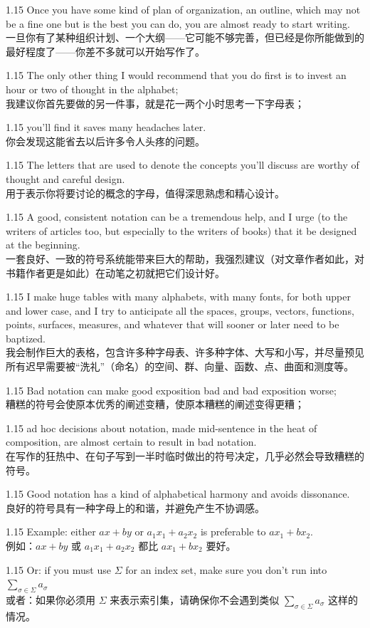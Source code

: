 \documentclass[12pt,a4paper]{article}
\newcommand{\bilingual}[2]{
    \begin{spacing}{1.15} %
        \noindent \normalsize #1 \\[-0.5ex] %
        \small \textcolor{blue!70!black}{#2} %
    \end{spacing}
    \vspace{0.8em} %
}
\begin{document}
\bilingual{Once you have some kind of plan of organization, an outline, which may not be a fine one but is the best you can do, you are almost ready to start writing.}
{一旦你有了某种组织计划、一个大纲——它可能不够完善，但已经是你所能做到的最好程度了——你差不多就可以开始写作了。} %

\bilingual{The only other thing I would recommend that you do first is to invest an hour or two of thought in the alphabet;}
{我建议你首先要做的另一件事，就是花一两个小时思考一下字母表；} %

\bilingual{you'll find it saves many headaches later.}
{你会发现这能省去以后许多令人头疼的问题。} %

\bilingual{The letters that are used to denote the concepts you'll discuss are worthy of thought and careful design.}
{用于表示你将要讨论的概念的字母，值得深思熟虑和精心设计。} %

\bilingual{A good, consistent notation can be a tremendous help, and I urge (to the writers of articles too, but especially to the writers of books) that it be designed at the beginning.}
{一套良好、一致的符号系统能带来巨大的帮助，我强烈建议（对文章作者如此，对书籍作者更是如此）在动笔之初就把它们设计好。} %

\bilingual{I make huge tables with many alphabets, with many fonts, for both upper and lower case, and I try to anticipate all the spaces, groups, vectors, functions, points, surfaces, measures, and whatever that will sooner or later need to be baptized.}
{我会制作巨大的表格，包含许多种字母表、许多种字体、大写和小写，并尽量预见所有迟早需要被“洗礼”（命名）的空间、群、向量、函数、点、曲面和测度等。} %

\bilingual{Bad notation can make good exposition bad and bad exposition worse;}
{糟糕的符号会使原本优秀的阐述变糟，使原本糟糕的阐述变得更糟；} %

\bilingual{ad hoc decisions about notation, made mid-sentence in the heat of composition, are almost certain to result in bad notation.}
{在写作的狂热中、在句子写到一半时临时做出的符号决定，几乎必然会导致糟糕的符号。} %

\bilingual{Good notation has a kind of alphabetical harmony and avoids dissonance.}
{良好的符号具有一种字母上的和谐，并避免产生不协调感。} %

\bilingual{Example: either $ax+by$ or $a_{1}x_{1}+a_{2}x_{2}$ is preferable to $ax_{1}+bx_{2}$.}
{例如：$ax+by$ 或 $a_{1}x_{1}+a_{2}x_{2}$ 都比 $ax_{1}+bx_{2}$ 要好。} %

\bilingual{Or: if you must use $\Sigma$ for an index set, make sure you don't run into $\sum_{\sigma\in\Sigma}a_{\sigma}$}
{或者：如果你必须用 $\Sigma$ 来表示索引集，请确保你不会遇到类似 $\sum_{\sigma\in\Sigma}a_{\sigma}$ 这样的情况。} %
\end{document}
